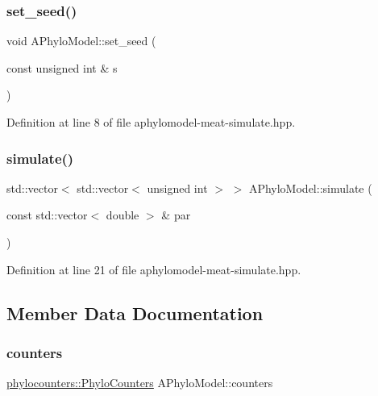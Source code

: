 \mbox{\label{class_a_phylo_model_a5f3faed4bad372764c056d1686508d6e}} 
\subsubsection{\texorpdfstring{set\+\_\+seed()}{set\_seed()}}
{\footnotesize\ttfamily void A\+Phylo\+Model\+::set\+\_\+seed (\begin{DoxyParamCaption}\item[{const unsigned int \&}]{s }\end{DoxyParamCaption})}



Definition at line 8 of file aphylomodel-\/meat-\/simulate.\+hpp.

\mbox{\label{class_a_phylo_model_ac75bb5a2f14d104733e2c194ae210986}} 
\subsubsection{\texorpdfstring{simulate()}{simulate()}}
{\footnotesize\ttfamily std\+::vector$<$ std\+::vector$<$ unsigned int $>$ $>$ A\+Phylo\+Model\+::simulate (\begin{DoxyParamCaption}\item[{const std\+::vector$<$ double $>$ \&}]{par }\end{DoxyParamCaption})}



Definition at line 21 of file aphylomodel-\/meat-\/simulate.\+hpp.



\subsection{Member Data Documentation}
\mbox{\label{class_a_phylo_model_ac301d6887933072072bdf3472df5c8a3}} 
\subsubsection{\texorpdfstring{counters}{counters}}
{\footnotesize\ttfamily \hyperlink{namespacebarry_1_1counters_1_1phylo_a4e401ffe66d04091343dcffaf915f8c3}{phylocounters\+::\+Phylo\+Counters} A\+Phylo\+Model\+::counters}



